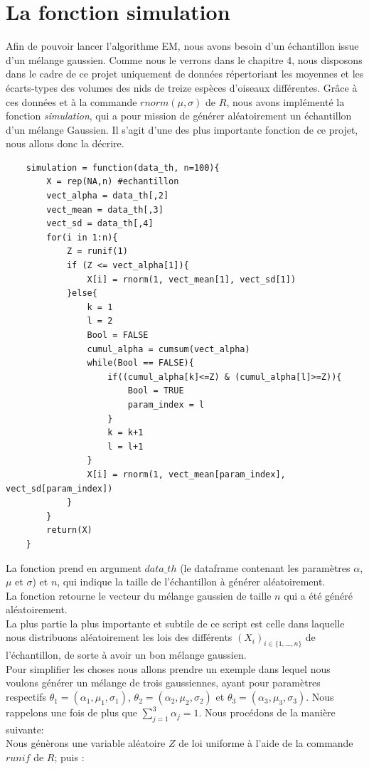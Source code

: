 \documentclass[frenchb]{report}
\newcommand{\1}{\mathbbm{1}}
\theoremstyle{definition}\newtheorem{defn}{Définition}
\theoremstyle{definition}\newtheorem{exm}{Exemple}
\theoremstyle{definition}\newtheorem{nota}{Notation}
\theoremstyle{definition}\newtheorem{rem}{Remarque}
\begin{document}
\section{La fonction simulation}
Afin de pouvoir lancer l'algorithme EM, nous avons besoin d'un échantillon issue d'un mélange gaussien. Comme nous le verrons dans le chapitre 4, nous disposons dans le cadre de ce projet uniquement de données répertoriant les moyennes et les écarts-types des volumes des nids de treize espèces d'oiseaux différentes. Grâce à ces données et à la commande $rnorm(\mu, \sigma)$ de $R$, nous avons implémenté la fonction \textit{simulation}, qui a pour mission de générer aléatoirement un échantillon d'un mélange Gaussien. Il s'agit d'une des plus importante fonction de ce projet, nous allons donc la décrire.
\begin{lstlisting}
	simulation = function(data_th, n=100){
		X = rep(NA,n) #echantillon
		vect_alpha = data_th[,2]
		vect_mean = data_th[,3]
		vect_sd = data_th[,4]
		for(i in 1:n){
			Z = runif(1)
			if (Z <= vect_alpha[1]){
				X[i] = rnorm(1, vect_mean[1], vect_sd[1])
			}else{
				k = 1
				l = 2
				Bool = FALSE
				cumul_alpha = cumsum(vect_alpha)
				while(Bool == FALSE){
					if((cumul_alpha[k]<=Z) & (cumul_alpha[l]>=Z)){
						Bool = TRUE
						param_index = l
					}
					k = k+1
					l = l+1
				}
				X[i] = rnorm(1, vect_mean[param_index], vect_sd[param_index])
			}
		}
		return(X)
	}
\end{lstlisting}
La fonction prend en argument $data\_th$ (le dataframe contenant les paramètres $\alpha$, $\mu$ et $\sigma$) et $n$, qui indique la taille de l'échantillon à générer aléatoirement. \\
La fonction retourne le vecteur du mélange gaussien de taille $n$ qui a été généré aléatoirement. \\
La plus partie la plus importante et subtile de ce script est celle dans laquelle nous distribuons aléatoirement les lois des différents $(X_i)_{i \in \{1, \dots, n\}}$ de l'échantillon, de sorte à avoir un bon mélange gaussien. \\
Pour simplifier les choses nous allons prendre un exemple dans lequel nous voulons générer un mélange de trois gaussiennes, ayant pour paramètres respectifs $\theta_1 = (\alpha_1, \mu_1, \sigma_1)$, $\theta_2 = (\alpha_2, \mu_2, \sigma_2)$ et $\theta_3 = (\alpha_3, \mu_3, \sigma_3)$. Nous rappelons une fois de plus que  $\displaystyle\sum_{j=1}^{3} \alpha_j = 1$. Nous procédons de la manière suivante: \\
Nous génèrons une variable aléatoire $Z$ de loi uniforme à l'aide de la commande $runif$ de $R$; puis :
\end{document}
